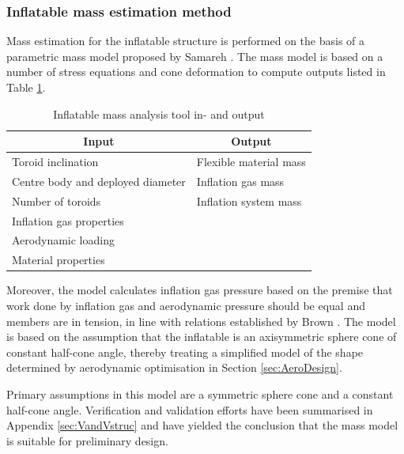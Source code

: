 \subsubsection{Inflatable mass estimation method}

Mass estimation for the inflatable structure is performed on the basis of a parametric mass model proposed by Samareh \cite{Samareh2011}. The mass model is based on a number of stress equations and cone deformation to compute outputs listed in Table \ref{tab:inflmass}.
\begin{table}[ht]
\caption{Inflatable mass analysis tool in- and output}
\centering
\begin{tabular}{|l||l|}
\hline
\multicolumn{1}{|c||}{{\bf Input}} & \multicolumn{1}{c|}{{\bf Output}} \\ \hline \hline
Toroid inclination         & Flexible material mass            \\ \hline
Centre body and deployed diameter        & Inflation gas mass                 \\ \hline
Number of toroids                 & Inflation system mass                \\ \hline
Inflation gas properties              &              \\ \hline
Aerodynamic loading               &                                   \\ \hline
Material properties  &                                   \\ \hline
\end{tabular}
\label{tab:inflmass}
\end{table}
Moreover, the model calculates inflation gas pressure based on the premise that work done by inflation gas and aerodynamic pressure should be equal and members are in tension, in line with relations established by Brown \cite{Brown2009}. The model is based on the assumption that the inflatable is an axisymmetric sphere cone of constant half-cone angle, thereby treating a simplified model of the shape determined by aerodynamic optimisation in Section \ref{sec:AeroDesign}. 

Primary assumptions in this model are a symmetric sphere cone and a constant half-cone angle. Verification and validation efforts have been summarised in Appendix \ref{sec:VandVstruc} and have yielded the conclusion that the mass model is suitable for preliminary design.


